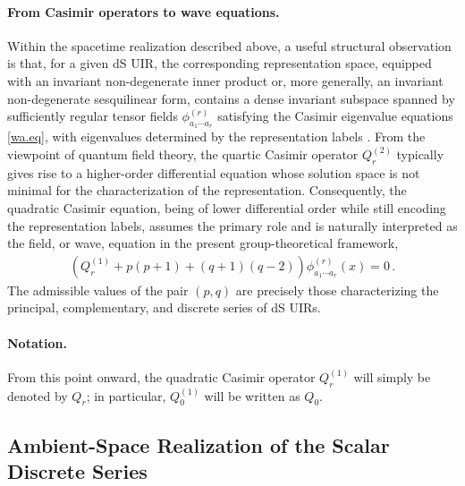 \documentclass[aps,twocolumn,nofootinbib]{revtex4}
\begin{document}
\paragraph{From Casimir operators to wave equations.} Within the spacetime realization described above, a useful structural observation is that, for a given dS UIR, the corresponding representation space, equipped with an invariant non-degenerate inner product or, more generally, an invariant non-degenerate sesquilinear form, contains a dense invariant subspace spanned by sufficiently regular tensor fields $\phi^{(r)}_{a_1\cdots a_r}$ satisfying the Casimir eigenvalue equations \eqref{wa.eq}, with eigenvalues determined by the representation labels \cite{Gazeau2022}. From the viewpoint of quantum field theory, the quartic Casimir operator $Q^{(2)}_r$ typically gives rise to a higher-order differential equation whose solution space is not minimal for the characterization of the representation. Consequently, the quadratic Casimir equation, being of lower differential order while still encoding the representation labels, assumes the primary role and is naturally interpreted as the field, or wave, equation in the present group-theoretical framework,
\begin{align}\label{fieldEq}
    \left(Q^{(1)}_r + p(p+1) + (q+1)(q-2)\right) \phi^{(r)}_{a_1\cdots a_r}(x) = 0 \,.
\end{align}
The admissible values of the pair $(p,q)$ are precisely those characterizing the principal, complementary, and discrete series of dS UIRs.

\paragraph{Notation.} From this point onward, the quadratic Casimir operator $Q_r^{(1)}$ will simply be denoted by $Q^{}_r$; in particular, $Q_0^{(1)}$ will be written as $Q^{}_0$.


\subsection{Ambient-Space Realization of the Scalar Discrete Series}\label{Sec. AmbientCoordinate}
\end{document}
